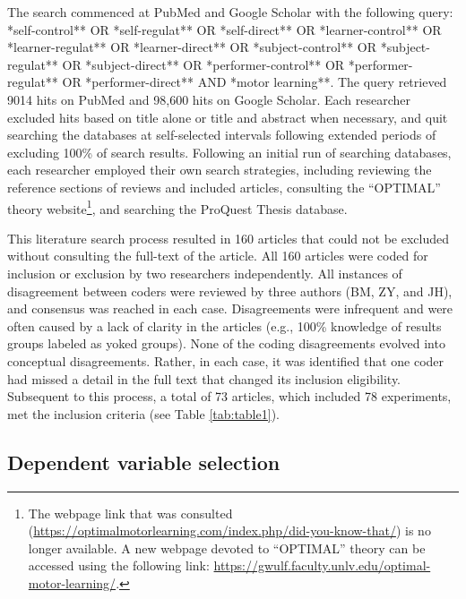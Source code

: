 \documentclass[
  english,
  man,floatsintext]{apa7}
\begin{document}
The search commenced at PubMed and Google Scholar with the following query: *self-control** OR *self-regulat** OR *self-direct** OR *learner-control** OR *learner-regulat** OR *learner-direct** OR *subject-control** OR *subject-regulat** OR *subject-direct** OR *performer-control** OR *performer-regulat** OR *performer-direct** AND *motor learning**. The query retrieved 9014 hits on PubMed and 98,600 hits on Google Scholar. Each researcher excluded hits based on title alone or title and abstract when necessary, and quit searching the databases at self-selected intervals following extended periods of excluding 100\% of search results. Following an initial run of searching databases, each researcher employed their own search strategies, including reviewing the reference sections of reviews and included articles, consulting the ``OPTIMAL'' theory website\footnote{The webpage link that was consulted (\url{https://optimalmotorlearning.com/index.php/did-you-know-that/}) is no longer available. A new webpage devoted to ``OPTIMAL'' theory can be accessed using the following link: \url{https://gwulf.faculty.unlv.edu/optimal-motor-learning/}.}, and searching the ProQuest Thesis database.

This literature search process resulted in 160 articles that could not be excluded without consulting the full-text of the article. All 160 articles were coded for inclusion or exclusion by two researchers independently. All instances of disagreement between coders were reviewed by three authors (BM, ZY, and JH), and consensus was reached in each case. Disagreements were infrequent and were often caused by a lack of clarity in the articles (e.g., 100\% knowledge of results groups labeled as yoked groups). None of the coding disagreements evolved into conceptual disagreements. Rather, in each case, it was identified that one coder had missed a detail in the full text that changed its inclusion eligibility. Subsequent to this process, a total of 73 articles, which included 78 experiments, met the inclusion criteria (see Table \ref{tab:table1}).

\hypertarget{dependent-variable-selection}{%
\subsection{Dependent variable selection}\label{dependent-variable-selection}}
\end{document}
